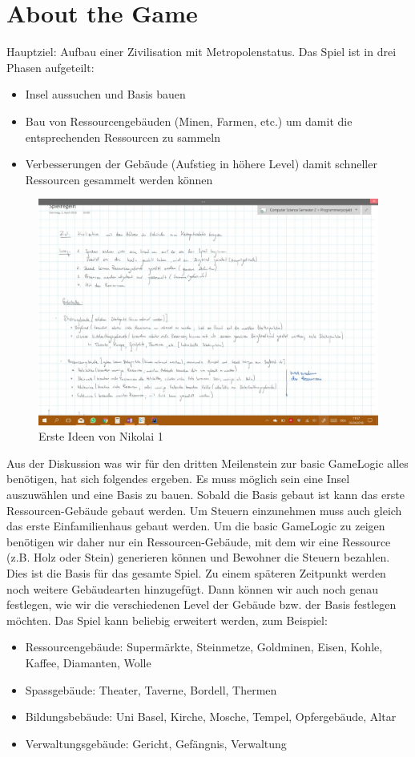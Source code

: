 \documentclass{scrartcl}
\newcommand{\n}{\newline}
\begin{document}
\section*{About the Game}
Hauptziel: Aufbau einer Zivilisation mit Metropolenstatus.\n
Das Spiel ist in drei Phasen aufgeteilt:
\begin{itemize}
	\item Insel aussuchen und Basis bauen
	\item Bau von Ressourcengebäuden (Minen, Farmen, etc.) um damit die entsprechenden Ressourcen zu sammeln
	\item Verbesserungen der Gebäude (Aufstieg in höhere Level) damit schneller Ressourcen gesammelt werden können
\end{itemize}
\begin{figure}[H]
	\includegraphics[width=\linewidth]{Idee1.jpg}
	\caption{Erste Ideen von Nikolai 1}
	\label{fig:map1}
\end{figure}
Aus der Diskussion was wir für den dritten Meilenstein zur basic GameLogic alles benötigen, hat sich folgendes ergeben. Es muss möglich sein eine Insel auszuwählen und eine Basis zu bauen. Sobald die Basis gebaut ist kann das erste Ressourcen-Gebäude gebaut werden. Um Steuern einzunehmen muss auch gleich das erste Einfamilienhaus gebaut werden.\n
Um die basic GameLogic zu zeigen benötigen wir daher nur ein Ressourcen-Gebäude, mit dem wir eine Ressource (z.B. Holz oder Stein) generieren können und Bewohner die Steuern bezahlen. Dies ist die Basis für das gesamte Spiel. \n
Zu einem späteren Zeitpunkt werden noch weitere Gebäudearten hinzugefügt. Dann können wir auch noch genau festlegen, wie wir die verschiedenen Level der Gebäude bzw. der Basis festlegen möchten. \n\n
Das Spiel kann beliebig erweitert werden, zum Beispiel:
\begin{itemize}
	\item Ressourcengebäude: \n
	Supermärkte, Steinmetze, Goldminen, Eisen, Kohle, Kaffee, Diamanten, Wolle
	\item Spassgebäude: \n
	Theater, Taverne, Bordell, Thermen
	\item Bildungsbebäude: \n
	Uni Basel, Kirche, Mosche, Tempel, Opfergebäude, Altar
	\item Verwaltungsgebäude: \n
	Gericht, Gefängnis, Verwaltung
\end{itemize}
\end{document}
